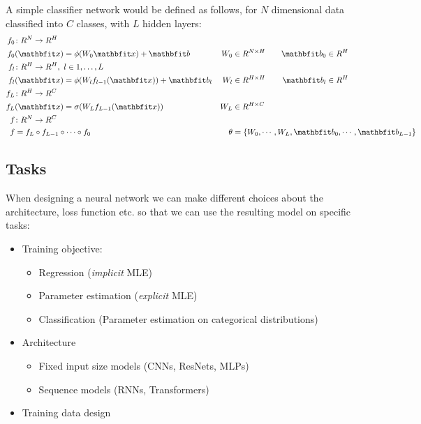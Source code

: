 A simple classifier network would be defined as follows, for $N$ dimensional data classified into $C$ classes, with $L$ hidden layers:
\begin{align*}
    \vfdef{f_0}{N}{H} \\
    f_{0}&(\x) = \phi(W_0 \x) + \vb &
    W_0 &\in \R^{N\times H} &
    \vb_0 &\in \R^{H}
\\%
    \vfdef{f_l}{H}{H},\ l \in 1,\dots,L \quad \\
    f_l&(\x) = \phi(W_l f_{l-1}(\x)) + \vb_l &
    W_l &\in \R^{H\times H} \quad &
    \vb_l &\in \R^{H}
\\%
    \vfdef{f_L}{H}{C} \\
    f_{L}&(\x) = \sigma(W_L f_{L-1}(\x)) &
    W_L &\in \R^{H \times C}
\\%
    \vfdef{f}{N}{C} \\
    f& = f_L \circ f_{L-1} \circ \cdots \circ f_0 &
    \theta &= \rlap{\{$W_0, \cdots, W_L, \vb_0, \cdots, \vb_{L-1} \} $}
\end{align*}


\subsection{Tasks}

When designing a neural network we can make different choices about the architecture, loss function etc. so that we can use the resulting model on specific tasks:
\begin{itemize}
    \item Training objective:
    \begin{itemize}
        \item Regression (\textit{implicit} MLE)
        \item Parameter estimation (\textit{explicit} MLE)
        \item Classification (Parameter estimation on categorical distributions)
    \end{itemize}
    \item Architecture
    \begin{itemize}
        \item Fixed input size models (CNNs, ResNets, MLPs)
        \item Sequence models (RNNs, Transformers)
    \end{itemize}
    \item Training data design
\end{itemize}

